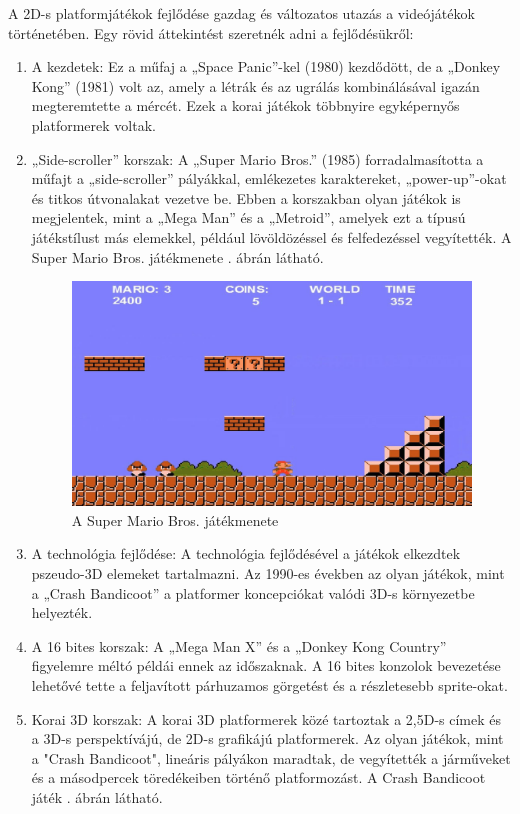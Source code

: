A 2D-s platformjátékok fejlődése gazdag és változatos utazás a videójátékok történetében. Egy rövid áttekintést szeretnék adni a fejlődésükről:
\begin{enumerate}
\item A kezdetek: Ez a műfaj a „Space Panic”-kel (1980) kezdődött, de a „Donkey Kong” (1981) volt az, amely a létrák és az ugrálás kombinálásával igazán megteremtette a mércét. Ezek a korai játékok többnyire egyképernyős platformerek voltak.\cite{redbull}
\item „Side-scroller” korszak: A „Super Mario Bros.” (1985) forradalmasította a műfajt a „side-scroller” pályákkal, emlékezetes karaktereket, „power-up”-okat és titkos útvonalakat vezetve be. Ebben a korszakban olyan játékok is megjelentek, mint a „Mega Man” és a „Metroid”, amelyek ezt a típusú játékstílust más elemekkel, például lövöldözéssel és felfedezéssel vegyítették.\cite{redbull} A Super Mario Bros. játékmenete . ábrán látható.
\begin{figure}[ht]
\centering
\includegraphics[scale=0.3]{images/super_mario_bros.jpg}
\caption{A Super Mario Bros. játékmenete}
\label{fig:supermariobros}
\end{figure}
\item A technológia fejlődése: A technológia fejlődésével a játékok elkezdtek pszeudo-3D elemeket tartalmazni. Az 1990-es években az olyan játékok, mint a „Crash Bandicoot” a platformer koncepciókat valódi 3D-s környezetbe helyezték.\cite{redbull}
\item A 16 bites korszak: A „Mega Man X” és a „Donkey Kong Country” figyelemre méltó példái ennek az időszaknak. A 16 bites konzolok bevezetése lehetővé tette a feljavított párhuzamos görgetést és a részletesebb sprite-okat.\cite{redbull}
\item  Korai 3D korszak: A korai 3D platformerek közé tartoztak a 2,5D-s címek és a 3D-s perspektívájú, de 2D-s grafikájú platformerek. Az olyan játékok, mint a "Crash Bandicoot", lineáris pályákon maradtak, de vegyítették a járműveket és a másodpercek töredékeiben történő platformozást.\cite{redbull} A Crash Bandicoot játék . ábrán látható.

\end{enumerate}
